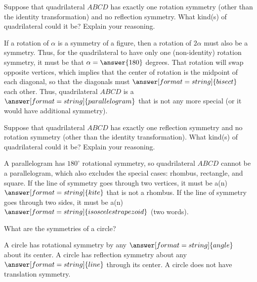 \documentclass[nooutcomes]{ximera}
\begin{document}
\begin{question}
Suppose that quadrilateral $ABCD$ has exactly one rotation symmetry (other than the identity transformation) and no reflection symmetry.  What kind(s) of quadrilateral could it be?  Explain your reasoning.  
\begin{freeResponse}
\end{freeResponse}
\begin{hint}
If a rotation of $\alpha$ is a symmetry of a figure, then a rotation of $2\alpha$ must also be a symmetry.  Thus, for the quadrilateral to have only one (non-identity) rotation symmetry, it must be that $\alpha = \answer{180}$ degrees.  That rotation will swap opposite vertices, which implies that the center of rotation is the midpoint of each diagonal, so that the diagonals must $\answer[format=string]{bisect}$ each other.  Thus, quadrilateral $ABCD$ is a $\answer[format=string]{parallelogram}$ that is not any more special (or it would have additional symmetry).  
\end{hint}
\end{question}

\begin{question}
Suppose that quadrilateral $ABCD$ has exactly one reflection symmetry and no rotation symmetry (other than the identity transformation).  What kind(s) of quadrilateral could it be?  Explain your reasoning.  
\begin{freeResponse}
\end{freeResponse}
\begin{hint}
A parallelogram has $180^\circ$ rotational symmetry, so quadrilateral $ABCD$ cannot be a parallelogram, which also excludes the special cases: rhombus, rectangle, and square.  If the line of symmetry goes through two vertices, 
it must be a(n) $\answer[format=string]{kite}$ that is not a rhombus.  If the line of symmetry goes through two sides, it must be a(n) $\answer[format=string]{isosceles trapezoid}$ (two words).  
\end{hint}
\end{question}

\begin{question}
What are the symmetries of a circle? 
\begin{freeResponse}
\end{freeResponse}
\begin{hint}
A circle has rotational symmetry by any $\answer[format=string]{angle}$ about its center.  A circle has reflection symmetry about any $\answer[format=string]{line}$ through its center.  A circle does not have translation symmetry.  
\end{hint}
\end{question}
\end{document}
